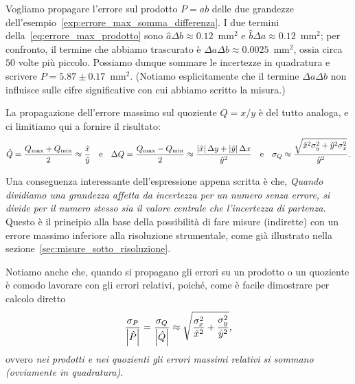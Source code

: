 \begin{examplebox}
  \begin{example}\label{exp:errore_max_prodotto}
    Vogliamo propagare l'errore sul prodotto $P = ab$ delle due grandezze
    dell'esempio~\ref{exp:errore_max_somma_differenza}. I due termini
    della~\eqref{eq:errore_max_prodotto} sono
    $\hat{a}\Delta b \approx 0.12$~mm$^2$
    e $\hat{b}\Delta a \approx 0.12$~mm$^2$; per confronto, il termine che
    abbiamo trascurato è $\Delta a\Delta b \approx 0.0025$~mm$^2$, ossia
    circa $50$ volte più piccolo. Possiamo dunque sommare le incertezze in
    quadratura e scrivere $P = 5.87 \pm 0.17$~mm$^2$.
    (Notiamo esplicitamente che il termine $\Delta a\Delta b$ non influisce
    sulle cifre significative con cui abbiamo scritto la misura.)
  \end{example}
\end{examplebox}

La propagazione dell'errore massimo sul quoziente $Q = x/y$ è del tutto
analoga, e ci limitiamo qui a fornire il risultato:
\begin{align}\label{eq:errore_max_quoziente}
  \hat{Q} = \frac{Q_{\max} + Q_{\min}}{2} \approx \frac{\hat{x}}{\hat{y}}
  \quad \text{e} \quad
  \Delta Q = \frac{Q_{\max} - Q_{\min}}{2} \approx
  \frac{\left| \hat{x} \right|\Delta y + \left| \hat{y} \right|\Delta x}{\hat{y}^2}
  \quad \text{e} \quad
  \sigma_Q \approx \frac{\sqrt{\hat{x}^2 \sigma_y^2 + \hat{y}^2 \sigma_x^2}}{\hat{y}^2}.
\end{align}

Una conseguenza interessante dell'espressione appena scritta è che,
\emph{Quando dividiamo una grandezza affetta da incertezza per un numero senza
  errore, si divide per il numero stesso sia il valore centrale che l'incertezza
  di partenza.}
Questo è il principio alla base della possibilità di fare misure (indirette)
con un errore massimo inferiore alla risoluzione strumentale, come già
illustrato nella sezione~\ref{sec:misure_sotto_risoluzione}.

Notiamo anche che, quando si propagano gli errori su un prodotto o un quoziente
è comodo lavorare con gli errori relativi, poiché, come è facile
dimostrare per calcolo diretto
\begin{align}
  \frac{\sigma_P}{\left| \hat{P} \right|} = \frac{\sigma_Q}{\left| \hat{Q} \right|} \approx
  \sqrt{\frac{\sigma_x^2}{\hat{x}^2} + \frac{\sigma_y^2}{\hat{y}^2}},
\end{align}
ovvero \emph{nei prodotti e nei quozienti gli errori massimi relativi si
 sommano (ovviamente in quadratura).}



